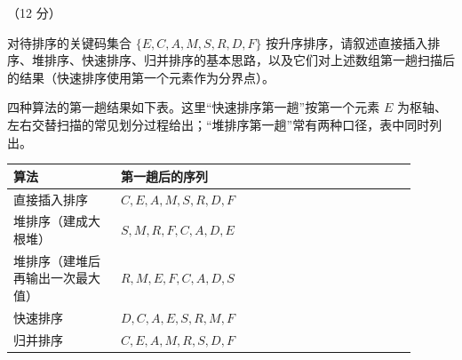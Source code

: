 \begin{question}[排序算法]（12 分）

对待排序的关键码集合 $\{E,C,A,M,S,R,D,F\}$ 按升序排序，请叙述直接插入排序、堆排序、快速排序、归并排序的基本思路，以及它们对上述数组第一趟扫描后的结果（快速排序使用第一个元素作为分界点）。

\begin{solution}
四种算法的第一趟结果如下表。这里“快速排序第一趟”按第一个元素 $E$ 为枢轴、左右交替扫描的常见划分过程给出；“堆排序第一趟”常有两种口径，表中同时列出。
\begin{center}
\begin{tabular}{@{}p{0.24\linewidth} p{0.66\linewidth}@{}}
\toprule
算法 & 第一趟后的序列 \\
\midrule
直接插入排序 & $C,E,A,M,S,R,D,F$ \\
堆排序（建成大根堆） & $S,M,R,F,C,A,D,E$ \\
堆排序（建堆后再输出一次最大值） & $R,M,E,F,C,A,D,S$ \\
快速排序 & $D,C,A,E,S,R,M,F$ \\
归并排序 & $C,E,A,M,R,S,D,F$ \\
\bottomrule
\end{tabular}
\end{center}
\end{solution}
\end{question}

